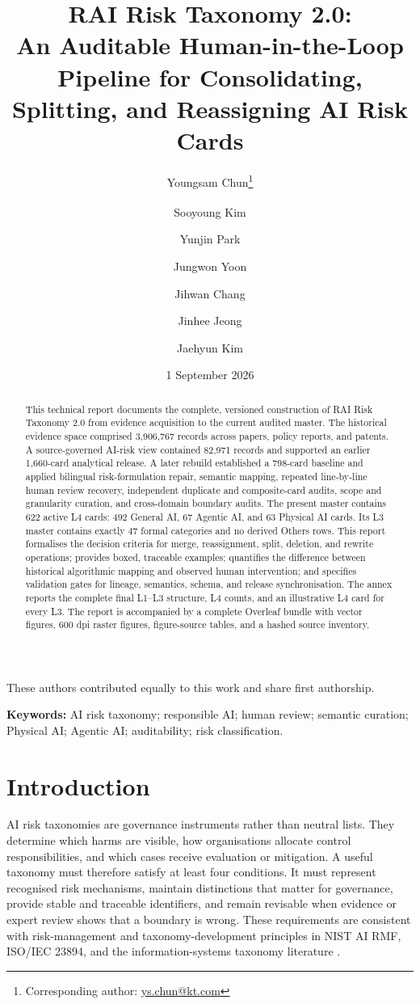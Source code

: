 \documentclass[10pt,a4paper]{article}
\title{\bfseries RAI Risk Taxonomy 2.0:\\An Auditable Human-in-the-Loop Pipeline for Consolidating, Splitting, and Reassigning AI Risk Cards}
\author[1]{Youngsam Chun\textsuperscript{\textdagger}\thanks{Corresponding author: \href{mailto:ys.chun@kt.com}{ys.chun@kt.com}}}
\author[1]{Sooyoung Kim\textsuperscript{\textdagger}}
\author[1]{Yunjin Park}
\author[1]{Jungwon Yoon}
\author{Jihwan Chang}
\author[1]{Jinhee Jeong}
\author[1]{Jaehyun Kim}
\affil[1]{Responsible AI Department, Frontier AI Lab, KT Corporation, Seoul, Republic of Korea}
\date{1 September 2026}
\begin{document}
\maketitle
\begin{center}
\small\textsuperscript{\textdagger}These authors contributed equally to this work and share first authorship.
\end{center}

\begin{abstract}
This technical report documents the complete, versioned construction of RAI Risk Taxonomy 2.0 from evidence acquisition to the current audited master. The historical evidence space comprised 3,906,767 records across papers, policy reports, and patents. A source-governed AI-risk view contained 82,971 records and supported an earlier 1,660-card analytical release. A later rebuild established a 798-card baseline and applied bilingual risk-formulation repair, semantic mapping, repeated line-by-line human review recovery, independent duplicate and composite-card audits, scope and granularity curation, and cross-domain boundary audits. The present master contains 622 active L4 cards: 492 General AI, 67 Agentic AI, and 63 Physical AI cards. Its L3 master contains exactly 47 formal categories and no derived Others rows. This report formalises the decision criteria for merge, reassignment, split, deletion, and rewrite operations; provides boxed, traceable examples; quantifies the difference between historical algorithmic mapping and observed human intervention; and specifies validation gates for lineage, semantics, schema, and release synchronisation. The annex reports the complete final L1--L3 structure, L4 counts, and an illustrative L4 card for every L3. The report is accompanied by a complete Overleaf bundle with vector figures, 600 dpi raster figures, figure-source tables, and a hashed source inventory.
\end{abstract}

\noindent\textbf{Keywords:} AI risk taxonomy; responsible AI; human review; semantic curation; Physical AI; Agentic AI; auditability; risk classification.

\section{Introduction}

AI risk taxonomies are governance instruments rather than neutral lists. They determine which harms are visible, how organisations allocate control responsibilities, and which cases receive evaluation or mitigation. A useful taxonomy must therefore satisfy at least four conditions. It must represent recognised risk mechanisms, maintain distinctions that matter for governance, provide stable and traceable identifiers, and remain revisable when evidence or expert review shows that a boundary is wrong. These requirements are consistent with risk-management and taxonomy-development principles in NIST AI RMF, ISO/IEC 23894, and the information-systems taxonomy literature \citep{nist2023,iso23894,nickerson2013}.
\end{document}
